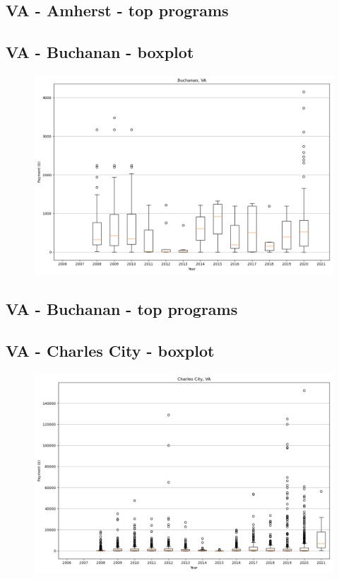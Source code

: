 \subsection*{VA - Amherst - top programs}

\newpage
\subsection*{VA - Buchanan - boxplot}
\begin{figure}[h]
\centering
\includegraphics[width=7in]{../output/boxplots/counties/Buchanan-VA_boxplot.png}
\end{figure}


\subsection*{VA - Buchanan - top programs}

\newpage
\subsection*{VA - Charles City - boxplot}
\begin{figure}[h]
\centering
\includegraphics[width=7in]{../output/boxplots/counties/Charles City-VA_boxplot.png}
\end{figure}



